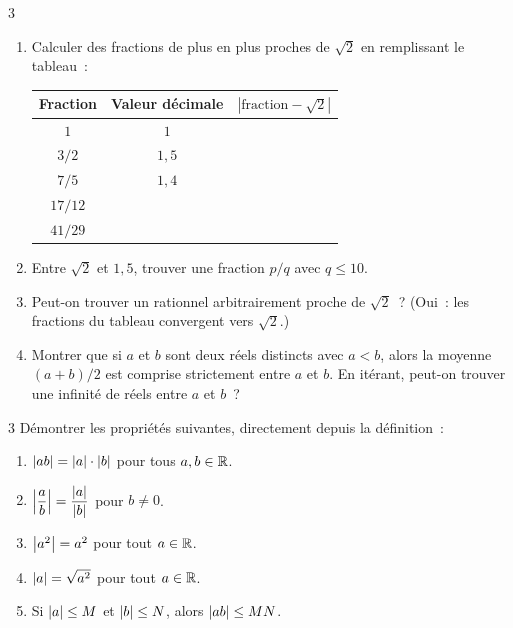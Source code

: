\begin{exo}{3}
\begin{enumerate}
  \item Calculer des fractions de plus en plus proches de $\sqrt{2}$ en
        remplissant le tableau~:
        \begin{center}
        \renewcommand{\arraystretch}{1.3}
        \begin{tabular}{|c|c|c|}
        \hline
        \rowcolor{BN!10} Fraction & Valeur d\'ecimale & $|\text{fraction}-\sqrt{2}|$ \\ \hline
        $1$ & $1$ & \\
        $3/2$ & $1{,}5$ & \\
        $7/5$ & $1{,}4$ & \\
        $17/12$ & & \\
        $41/29$ & & \\
        \hline
        \end{tabular}
        \end{center}
  \item Entre $\sqrt{2}$ et $1{,}5$, trouver une fraction $p/q$ avec $q \leq 10$.
  \item Peut-on trouver un rationnel arbitrairement proche de $\sqrt{2}$~?
        (Oui~: les fractions du tableau convergent vers $\sqrt{2}$.)
  \item Montrer que si $a$ et $b$ sont deux r\'eels distincts avec $a < b$,
        alors la moyenne $(a+b)/2$ est comprise strictement entre $a$ et $b$.
        En it\'erant, peut-on trouver une infinit\'e de r\'eels entre $a$ et $b$~?
\end{enumerate}
\end{exo}

\begin{exo}{3}
D\'emontrer les propri\'et\'es suivantes, directement depuis la d\'efinition~:
\begin{enumerate}
  \item $\left|ab\right| = \left|a\right|\cdot\left|b\right|$ pour tous $a,b \in \mathbb{R}$.
  \item $\left|\dfrac{a}{b}\right| = \dfrac{\left|a\right|}{\left|b\right|}$ pour $b\ne0$.
  \item $\left|a^2\right| = a^2$ pour tout $a\in\mathbb{R}$.
  \item $\left|a\right| = \sqrt{a^2}$ pour tout $a\in\mathbb{R}$.
  \item Si $\left|a\right|\leq M$ et $\left|b\right|\leq N$, alors $\left|ab\right|\leq MN$.
\end{enumerate}
\end{exo}

